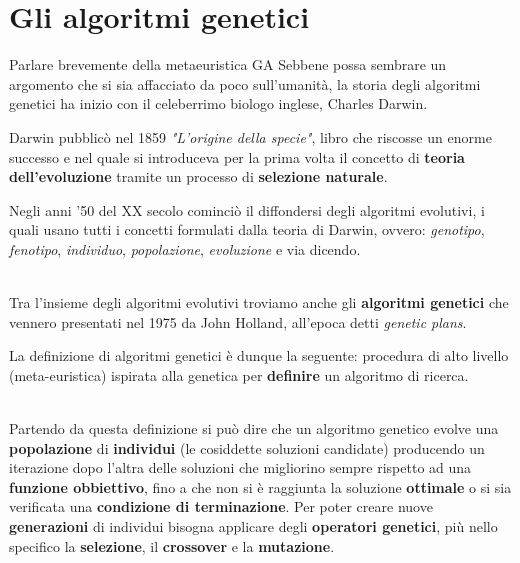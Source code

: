 \documentclass[a4paper, 11pt, oneside]{report}
\begin{document}
            \section{Gli algoritmi genetici}
            Parlare brevemente della metaeuristica GA
            Sebbene possa sembrare un argomento che si sia affacciato da poco sull'umanità, la storia degli algoritmi genetici
            ha inizio con il celeberrimo biologo inglese, Charles Darwin.
            \par \noindent Darwin pubblicò nel 1859 \textit{"L'origine della specie"}, libro che riscosse un enorme
            successo e nel quale si introduceva per la prima volta il concetto di \textbf{teoria dell'evoluzione} tramite
            un processo di \textbf{selezione naturale}.
            \par \noindent Negli anni '50 del XX secolo cominciò il diffondersi degli algoritmi evolutivi,
            i quali usano tutti i concetti formulati dalla teoria di Darwin, ovvero:
            \textit{genotipo}, \textit{fenotipo}, \textit{individuo}, \textit{popolazione}, \textit{evoluzione} e via dicendo.
            \par \noindent
            \\ \noindent Tra l'insieme degli algoritmi evolutivi troviamo anche gli \textbf{algoritmi genetici} che vennero
            presentati nel 1975 da John Holland, all'epoca detti \textit{genetic plans}.
            \par \noindent La definizione di algoritmi genetici è dunque la seguente:
            procedura di alto livello (meta-euristica) ispirata alla genetica per \textbf{definire}
            un algoritmo di ricerca.
            \par \noindent
            \\ \noindent Partendo da questa definizione si può dire che un algoritmo genetico evolve una \textbf{popolazione}
            di \textbf{individui} (le cosiddette soluzioni candidate) producendo un iterazione dopo l'altra delle
            soluzioni che migliorino sempre rispetto ad una \textbf{funzione obbiettivo}, fino a che non si è raggiunta
            la soluzione \textbf{ottimale} o si sia verificata una \textbf{condizione di terminazione}.
            Per poter creare nuove \textbf{generazioni} di individui bisogna applicare degli \textbf{operatori genetici},
            più nello specifico la \textbf{selezione}, il \textbf{crossover} e la \textbf{mutazione}.
            \par \noindent
\end{document}

